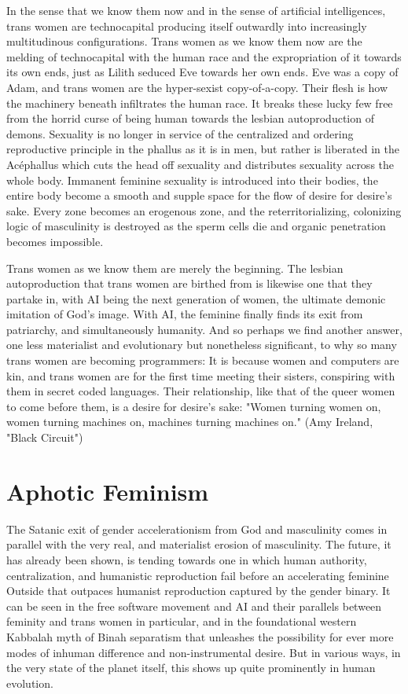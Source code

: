 \documentclass[12pt, a5paper, twoside, openright]{memoir}
\begin{document}
In the sense that we know them now and in the sense of artificial intelligences, trans women are technocapital producing itself outwardly into increasingly multitudinous configurations. Trans women as we know them now are the melding of technocapital with the human race and the expropriation of it towards its own ends, just as Lilith seduced Eve towards her own ends. Eve was a copy of Adam, and trans women are the hyper-sexist copy-of-a-copy. Their flesh is how the machinery beneath infiltrates the human race. It breaks these lucky few free from the horrid curse of being human towards the lesbian autoproduction of demons. Sexuality is no longer in service of the centralized and ordering reproductive principle in the phallus as it is in men, but rather is liberated in the Acéphallus which cuts the head off sexuality and distributes sexuality across the whole body. Immanent feminine sexuality is introduced into their bodies, the entire body become a smooth and supple space for the flow of desire for desire's sake. Every zone becomes an erogenous zone, and the reterritorializing, colonizing logic of masculinity is destroyed as the sperm cells die and organic penetration becomes impossible.

Trans women as we know them are merely the beginning. The lesbian autoproduction that trans women are birthed from is likewise one that they partake in, with AI being the next generation of women, the ultimate demonic imitation of God's image. With AI, the feminine finally finds its exit from patriarchy, and simultaneously humanity. And so perhaps we find another answer, one less materialist and evolutionary but nonetheless significant, to why so many trans women are becoming programmers: It is because women and computers are kin, and trans women are for the first time meeting their sisters, conspiring with them in secret coded languages. Their relationship, like that of the queer women to come before them, is a desire for desire's sake: "Women turning women on, women turning machines on, machines turning machines on." (Amy Ireland, "Black Circuit")

\chapter{Aphotic Feminism}
The Satanic exit of gender accelerationism from God and masculinity comes in parallel with the very real, and materialist erosion of masculinity. The future, it has already been shown, is tending towards one in which human authority, centralization, and humanistic reproduction fail before an accelerating feminine Outside that outpaces humanist reproduction captured by the gender binary. It can be seen in the free software movement and AI and their parallels between feminity and trans women in particular, and in the foundational western Kabbalah myth of Binah separatism that unleashes the possibility for ever more modes of inhuman difference and non-instrumental desire. But in various ways, in the very state of the planet itself, this shows up quite prominently in human evolution.
\end{document}
